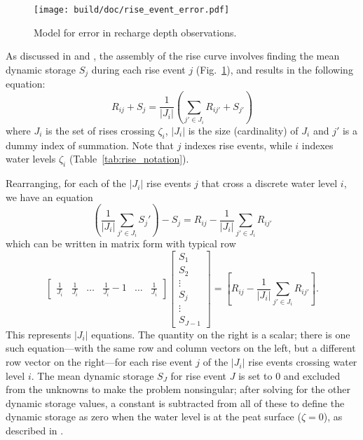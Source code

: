 \documentclass[11pt,a4paper]{article}
\begin{document}
\begin{figure}[b!]
  \centerline{\texttt{[image: build/doc/rise\_event\_error.pdf]}}
  \caption{Model for error in recharge depth observations.}
  \label{fig:rise_event_error}
\end{figure}

As discussed in \citet{Cobb_et_al_2017} and
\citet{Cobb_and_Harvey_2019}, the assembly of the rise curve involves
finding the mean dynamic storage $S_j$ during each rise event $j$
(Fig.~\ref{fig:rise_event_error}), and results in the following
equation:
\begin{equation}
  R_{ij} + S_j = \frac{1}{|J_i|}\left(\sum_{j'\in J_i} R_{ij'} + S_{j'}\right)
\end{equation}
where $J_i$ is the set of rises crossing $\zeta_i$, $|J_i|$ is the
size (cardinality) of $J_i$ and $j'$ is a dummy index of summation.
Note that $j$ indexes rise events, while $i$ indexes water levels
$\zeta_i$ (Table~\ref{tab:rise_notation}).

Rearranging, for each of the $|J_i|$ rise events $j$ that cross a
discrete water level $i$, we have an equation
\begin{equation}
  \left(\frac{1}{|J_i|}\sum_{j' \in J_i} S_j' \right) - S_j = R_{ij} - \frac{1}{|J_i|} \sum_{j' \in J_i} R_{ij'}
\end{equation}
which can be written in matrix form with typical row
\begin{equation}
  \label{eq:rise_vector_equation}
  \left[
    \begin{array}{cccccc}
      \frac{1}{J_i} & \frac{1}{J_i} & \ldots & \frac{1}{J_i} - 1 & \ldots & \frac{1}{J_i}
    \end{array}
\right]\left[
  \begin{array}{c}
    S_1 \\
    S_2 \\
    \vdots \\
    S_j \\
    \vdots \\
    S_{J-1}
  \end{array}
\right]
 = \left[R_{ij} - \frac{1}{|J_i|}\sum_{j' \in J_i} R_{ij'}\right].
\end{equation}
This represents $|J_i|$ equations. The quantity on the right is a
scalar; there is one such equation---with the same row and column
vectors on the left, but a different row vector on the right---for
each rise event $j$ of the $|J_i|$ rise events crossing water level
$i$.  The mean dynamic storage $S_J$ for rise event $J$ is set to 0
and excluded from the unknowns to make the problem nonsingular; after
solving for the other dynamic storage values, a constant is subtracted
from all of these to define the dynamic storage as zero when the water
level is at the peat surface ($\zeta = 0$), as described in
\citet{Cobb_and_Harvey_2019}.
\end{document}
